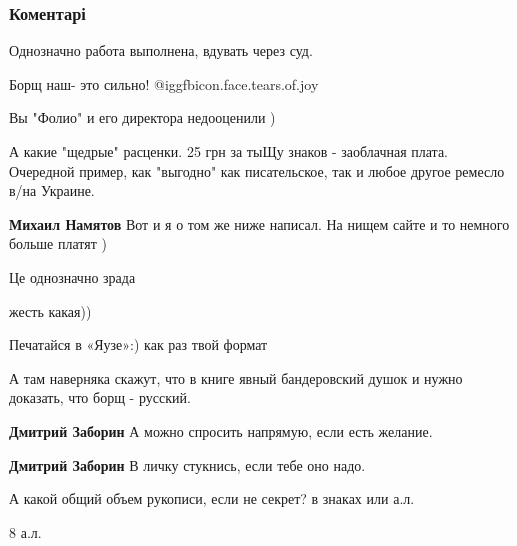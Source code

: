  
 
 
 
 
\subsubsection{Коментарі}

\begin{itemize} %
Однозначно работа выполнена, вдувать через суд.

Борщ наш- это сильно!  @igg{fbicon.face.tears.of.joy} 

Вы "Фолио" и его директора недооценили )

А какие "щедрые" расценки. 25 грн за тыЩу знаков - заоблачная плата. Очередной пример, как "выгодно" как писательское, так и любое другое ремесло в/на Украине.

\begin{itemize} %
\textbf{Михаил Намятов} Вот и я о том же ниже написал. На нищем сайте и то немного больше платят )
\end{itemize} %

Це однозначно зрада

жесть какая))


Печатайся в «Яузе»:) как раз твой формат

\begin{itemize} %
А там наверняка скажут, что в книге явный бандеровский душок и нужно доказать, что борщ - русский.

\textbf{Дмитрий Заборин} А можно спросить напрямую, если есть желание.

\textbf{Дмитрий Заборин} В личку стукнись, если тебе оно надо.
\end{itemize} %

А какой общий объем рукописи, если не секрет? в знаках или а.л.

\begin{itemize} %
8 а.л.


\end{itemize}
\end{itemize}
